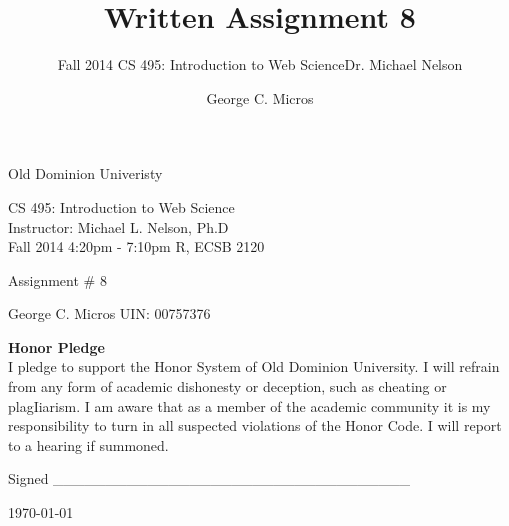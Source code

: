 \documentclass[]{svmono}
\begin{document}
\begin{titlepage}    
\begin{center}
\vspace*{0in}
\huge{\sc  Old Dominion Univeristy\\  }



\vspace{1in}
\Large{\sc CS 495: Introduction to Web Science \\ Instructor: Michael L. Nelson, Ph.D \\ Fall 2014 4:20pm - 7:10pm R, ECSB 2120\\}

\vspace{1in}
\Large{Assignment \# 8\\}

\vspace{.5cm}
\Large{ \sc George C.  Micros  UIN: 00757376\\ }



\vspace {7cm}

{\large \bf {Honor Pledge}}\\
{I pledge to support the Honor System of Old Dominion University. I will refrain from any form of academic dishonesty or deception, such as cheating or plagIiarism. I am aware that as a member of the academic community it is my responsibility to turn in all suspected violations of the Honor Code. I will report to a hearing if summoned. }\\
\vspace {.5cm}

{Signed \_\_\_\_\_\_\_\_\_\_\_\_\_\_\_\_\_\_\_\_\_\_\_\_\_\_\_\_\_\_\_\_\_\_}


\today
\end{center}
\end{titlepage}



\author{George C. Micros}
\title{Written Assignment 8}
\subtitle{Fall 2014 \newline  CS 495: Introduction to Web Science\newline Dr. Michael Nelson}
\maketitle


\tableofcontents
\end{document}
